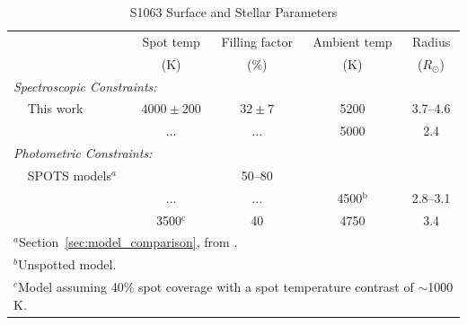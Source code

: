 \documentclass[modern,trackchanges]{aastex631}
\begin{document}
\begin{table}[]
\label{tab:s1063parameters}
\caption{S1063 Surface and Stellar Parameters}
\begin{tabular}{llcccc}

  &         & Spot temp  & Filling factor & Ambient temp & Radius  \\
   &        &  (K) & (\%) &  (K) & ($R_{\odot}$) \\ \hline
\multicolumn{3}{l}{\textit{Spectroscopic Constraints:}}  \\
\phantom{EEE} & This work     & $4000\pm200$  & $32\pm7$    & 5200 &   3.7--4.6     \\
& \citet{mathieu03} &  ...    &  ...    &     5000    &  2.4  \\
\multicolumn{3}{l}{\textit{Photometric Constraints:}} \\
& SPOTS models$^{a}$  &      &  50--80    &         &        \\
& \citet{leiner17} & ... & ... & 4500$^\textrm{b}$ & 2.8--3.1 \\
& & 3500$^\textrm{c}$ & 40 & 4750 & 3.4 \\
\hline
\multicolumn{6}{l}{$^{a}$Section~\ref{sec:model_comparison}, from \citet{somers20}.} \\
\multicolumn{6}{l}{$^{b}$Unspotted model.} \\
\multicolumn{6}{l}{$^{c}$Model assuming 40\% spot coverage with a spot temperature contrast of $\sim$1000 K.}
\end{tabular}
\end{table}

\end{document}
